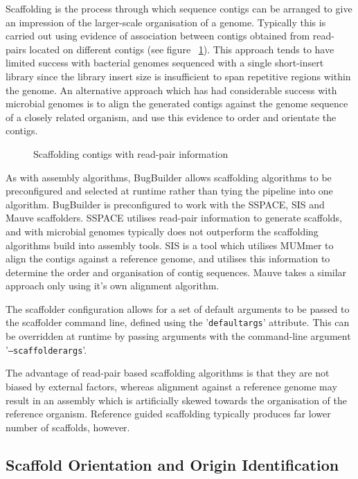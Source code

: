 \documentclass[a4paper,10pt]{article}
\begin{document}
Scaffolding is the process through which sequence contigs can be arranged to
give an impression of the larger-scale organisation of a genome. Typically this
is carried out using evidence of association between contigs obtained from
read-pairs located on different contigs (see figure
~\ref{fig:ReadPairScaffolding}). This approach tends to have limited success
with bacterial genomes sequenced with a single short-insert library since the
library insert size is insufficient to span repetitive regions within the
genome. An alternative approach which has had considerable success with
microbial genomes is to align the generated contigs against the genome sequence
of a closely related organism, and use this evidence to order and orientate the
contigs.

\begin{figure}[ht]
\caption{Scaffolding contigs with read-pair information}
\label{fig:ReadPairScaffolding}
\end{figure}

As with assembly algorithms, BugBuilder allows scaffolding algorithms to be
preconfigured and selected at runtime rather than tying the pipeline into one
algorithm. BugBuilder is preconfigured to work with the SSPACE, SIS and Mauve
scaffolders. SSPACE utilises read-pair information to generate scaffolds, and
with microbial genomes typically does not outperform the scaffolding algorithms
build into assembly tools. SIS is a tool which utilises MUMmer to align the
contigs against a reference genome, and utilises this information to determine
the order and organisation of contig sequences. Mauve takes a similar approach
only using it's own alignment algorithm. 

The scaffolder configuration allows for a set of default arguments to be passed
to the scaffolder command line, defined using the '{\tt default\-args}'
attribute. This can be overridden at runtime by passing arguments with the
command-line argument '{\tt --scaffolder\-args}'. 

The advantage of read-pair based scaffolding algorithms is that they are not
biased by external factors, whereas alignment against a reference genome may
result in an assembly which is artificially skewed towards the organisation of
the reference organism. Reference guided scaffolding typically produces far
lower number of scaffolds, however.

\subsection{Scaffold Orientation and Origin Identification}
\end{document}
